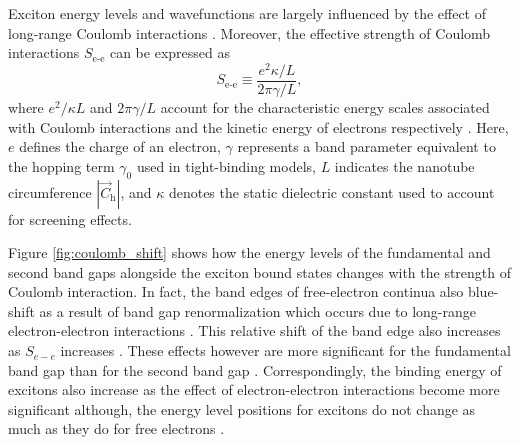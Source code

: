 
Exciton energy levels and wavefunctions are largely influenced by the effect of long-range Coulomb interactions \cite{ando2006effects}. Moreover, the effective strength of Coulomb interactions $S_\text{e-e}$ can be expressed as
%
\begin{equation}
	S_\text{e-e} \equiv \dfrac{e^2 \kappa / L}{2 \pi \gamma / L},
\end{equation}
%
where $e^2 /\kappa L$ and $2 \pi \gamma / L$ account for the characteristic energy scales associated with Coulomb interactions and the kinetic energy of electrons respectively \cite{ando2005theory}. Here, $e$ defines the charge of an electron, $\gamma$ represents a band parameter equivalent to the hopping term $\gamma_0$ used in tight-binding models, $L$ indicates the nanotube circumference $|\vec{C}_\text{h}|$, and $\kappa$ denotes the static dielectric constant used to account for screening effects.

Figure \ref{fig:coulomb_shift} shows how the energy levels of the fundamental and second band gaps alongside the exciton bound states changes with the strength of Coulomb interaction. In fact, the band edges of free-electron continua also blue-shift as a result of band gap renormalization which occurs due to long-range electron-electron interactions \cite{ando1997excitons}. This relative shift of the band edge also increases as $S_{e-e}$ increases \cite{ando2005theory}. These effects however are more significant for the fundamental band gap than for the second band gap \cite{ando2005theory}. Correspondingly, the binding energy of excitons also increase as the effect of electron-electron interactions become more significant although, the energy level positions for excitons do not change as much as they do for free electrons \cite{ando2005theory}.

